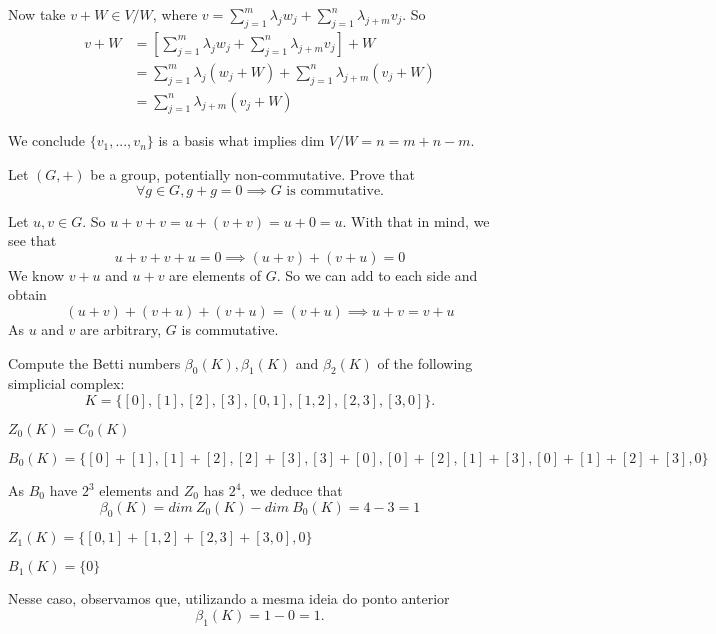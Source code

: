 Now take $v + W \in V/W$, where $v = \sum_{j=1}^m \lambda_j w_j + \sum_{j=1}^n
\lambda_{j+m} v_j$. So 
\begin{equation*}
    \begin{split}
        v + W &= \left[\sum_{j=1}^m \lambda_j w_j + \sum_{j=1}^n
        \lambda_{j+m} v_j\right] + W \\
        &= \sum_{j=1}^m \lambda_j (w_j + W) + \sum_{j=1}^n
        \lambda_{j+m} (v_j+ W) \\
        &= \sum_{j=1}^n
        \lambda_{j+m} (v_j+ W) 
    \end{split}
\end{equation*}

We conclude $\{v_1,
..., v_{n}\}$ is a basis what implies $\text{dim } V/W = n = m + n - m$. 

\noindent\linia

\begin{exercise}
    Let $(G, +)$ be a group, potentially non-commutative. Prove that
    $$\forall g \in G, g + g = 0 \implies G \text{ is commutative.}$$
\end{exercise}

Let $u,v \in G$. So $u + v + v = u + (v + v) = u + 0 = u$. With that in mind,
we see that 
$$
u + v + v + u = 0 \implies (u + v) + (v + u) = 0 
$$
We know $v + u$ and $u + v$ are elements of $G$. So we can add to each side
and obtain 
$$
(u + v) + (v + u) + (v + u) = (v + u) \implies u + v = v + u
$$
As $u$ and $v$ are arbitrary, $G$ is commutative. 

\noindent\linia

\begin{exercise}
    Compute the Betti numbers $\beta_0(K), \beta_1(K)$ and $\beta_2(K)$ of the
    following simplicial complex:
    $$
    K = \{[0], [1], [2], [3], [0, 1], [1, 2], [2, 3], [3, 0]\}.
    $$
\end{exercise}

$Z_0(K) = C_0(K)$

$B_0(K) = \{[0] + [1], [1] + [2], [2] + [3], [3] + [0], [0] + [2], [1] + [3],
[0] + [1] + [2] + [3], 0\}$

As $B_0$ have $2^3$ elements and $Z_0$ has $2^4$, we deduce that 
$$\beta_0(K) = dim ~Z_0(K) - dim ~B_0(K) = 4 - 3 = 1$$

$Z_1(K) = \{[0,1] + [1,2] + [2,3] + [3,0], 0\}$

$B_1(K) = \{0\}$

Nesse caso, observamos que, utilizando a mesma ideia do ponto anterior 
$$\beta_1(K) = 1 - 0 = 1.$$

